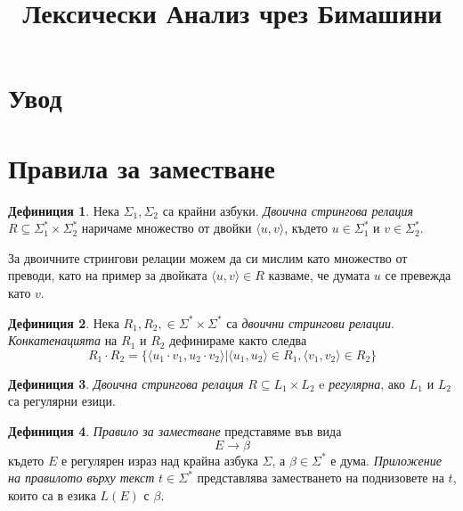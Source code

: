 \documentclass[12pt, oneside]{article}
\title{Лексически Анализ чрез Бимашини}
\theoremstyle{definition}
\newtheorem{definition}{Дефиниция}[section]
\begin{document}
\tableofcontents
\pagebreak

\section{Увод}

\section{Правила за заместване}

\begin{definition}
	Нека \( \Sigma_1, \Sigma_2 \) са крайни азбуки. \emph{Двоична стрингова релация} \( R \subseteq \Sigma_1^* \times \Sigma_2^* \) наричаме множество от двойки \( \langle u, v \rangle \), където \( u \in \Sigma_1^* \) и \( v \in \Sigma_2^* \).
\end{definition}

За двоичните стрингови релации можем да си мислим като множество от преводи, като на пример за двойката \( \langle u, v \rangle \in R \) казваме, че думата \( u \) се превежда като \( v \).

\begin{definition}
	Нека \( R_1, R_2, \in \Sigma^* \times \Sigma^* \) са \emph{двоични стрингови релации}. \emph{Конкатенацията} на \( R_1 \) и \( R_2 \) дефинираме както следва
	\[ R_1 \cdot R_2 = \{ \langle u_1 \cdot v_1, u_2 \cdot v_2 \rangle | \langle u_1, u_2 \rangle \in R_1, \langle v_1, v_2 \rangle \in R_2 \} \]
\end{definition}

\begin{definition}
	\emph{Двоична стрингова релация} \( R \subseteq L_1 \times L_2 \) e \emph{регулярна}, ако \(L_1\) и \(L_2\) са регулярни езици.
\end{definition}

\begin{definition}
	\emph{Правило за заместване} представяме във вида
	\[ E \to \beta \]
	където \( E \) е регулярен израз над крайна азбука \( \Sigma \), а \( \beta \in \Sigma^* \) е дума.
	\emph{Приложение на правилото върху текст} \( t \in \Sigma^* \) представлява заместването на поднизовете на \( t \), които са в езика \( L(E) \) с \( \beta \).
\end{definition}
\end{document}
